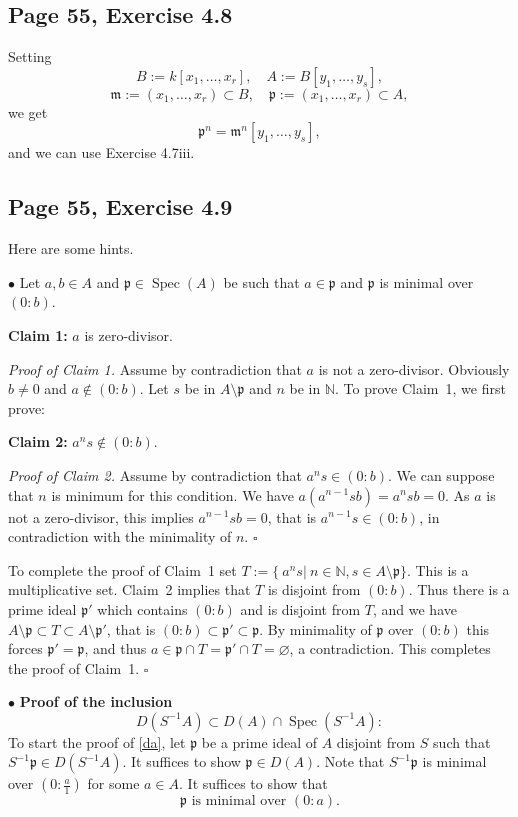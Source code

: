 \documentclass[parskip=half,fontsize=12pt]{scrartcl}%
\newcommand{\mf}{\mathfrak}
\newcommand{\mmm}{\mf m}
\newcommand{\ppp}{\mf p}
\newcommand{\bu}{\bullet}
\newcommand{\Spec}{\operatorname{Spec}}\newcommand{\Sp}{\operatorname{Spec}}
\begin{document}
\subsection{Page 55, Exercise 4.8}%

Setting 
$$
B:=k[x_1,\dots,x_r],\quad A:=B[y_1,\dots,y_s],
$$ 
$$
\mmm:=(x_1,\dots,x_r)\subset B,\quad\ppp:=(x_1,\dots,x_r)\subset A,
$$ 
we get 
$$
\ppp^n=\mmm^n[y_1,\dots,y_s],
$$ 
and we can use Exercise 4.7iii.


\subsection{Page 55, Exercise 4.9}%

Here are some hints.

$\bu$ Let $a,b\in A$ and $\ppp\in\Spec(A)$ be such that $a\in\ppp$ and $\ppp$ is minimal over $(0:b)$.

\textbf{Claim 1:} $a$ is zero-divisor.

\emph{Proof of Claim 1.} Assume by contradiction that $a$ is not a zero-divisor. Obviously $b\ne0$ and $a\notin(0:b)$. Let $s$ be in $A\setminus\ppp$ and $n$ be in $\mathbb N$. To prove Claim~1, we first prove:

\textbf{Claim 2:} $a^ns\notin(0:b)$.

\emph{Proof of Claim 2.} Assume by contradiction that $a^ns\in(0:b)$. We can suppose that $n$ is minimum for this condition. %
We have $a(a^{n-1}sb)=a^nsb=0$. As $a$ is not a zero-divisor, this implies $a^{n-1}sb=0$, that is $a^{n-1}s\in(0:b)$, in contradiction with the minimality of $n$. $\square$

To complete the proof of Claim~1 set $T:=\{\ a^ns|\ n\in\mathbb N,s\in A\setminus\ppp\}$. This is a multiplicative set. Claim~2 implies that $T$ is disjoint from $(0:b)$. Thus there is a prime ideal $\ppp'$ which contains $(0:b)$ and is disjoint from $T$, and we have $A\setminus\ppp\subset T\subset A\setminus\ppp'$, that is $(0:b)\subset\ppp'\subset\ppp$. By minimality of $\ppp$ over $(0:b)$ this forces $\ppp'=\ppp$, and thus $a\in\ppp\cap T=\ppp'\cap T=\varnothing$, a contradiction. This completes the proof of Claim~1. $\square$ 

$\bu$ \textbf{Proof of the inclusion} 
\begin{equation}\label{da}
D(S^{-1}A)\subset D(A)\cap\Sp(S^{-1}A):
\end{equation}
To start the proof of \eqref{da}, let $\ppp$ be a prime ideal of $A$ disjoint from $S$ such that $S^{-1}\ppp\in D(S^{-1}A)$. It suffices to show $\ppp\in D(A)$. Note that $S^{-1}\ppp$ is minimal over $(0:\frac a1)$ for some $a\in A$. %
It suffices to show that %
\begin{equation}\label{da2}
\ppp\text{ is minimal over }(0:a).
\end{equation}
\end{document}
